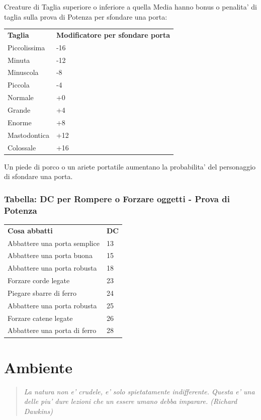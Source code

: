 \documentclass[a4paper,11pt,twoside,openany]{book}
\begin{document}
{		Creature di Taglia superiore o inferiore a quella Media hanno bonus o penalita' di taglia sulla prova di Potenza per sfondare una porta:
		
		\bigskip
		
		\begin{tabular}{ll}
			\toprule
			\textbf{Taglia} & \textbf{Modificatore per sfondare porta}\tabularnewline
			Piccolissima & -16\tabularnewline
			Minuta & -12\tabularnewline
			Minuscola & -8\tabularnewline
			Piccola & -4\tabularnewline
			Normale & +0\tabularnewline
			Grande & +4\tabularnewline
			Enorme & +8\tabularnewline
			Mastodontica & +12\tabularnewline
			Colossale & +16\tabularnewline
		\end{tabular}
		
		\bigskip
		
		Un piede di porco o un ariete portatile aumentano la probabilita' del personaggio di sfondare una porta.
		
		\subsubsection{Tabella: DC per Rompere o Forzare oggetti - Prova di Potenza}
		
		\label{tabella-dc-per-rompere-o-forzare-oggetti---prova-di-potenza}
		\bigskip
		
		\begin{tabular}{ll}
			\toprule
			\textbf{Cosa abbatti} & \textbf{DC}\tabularnewline
			Abbattere una porta semplice & 13\tabularnewline
			Abbattere una porta buona & 15\tabularnewline
			Abbattere una porta robusta & 18\tabularnewline
			Forzare corde legate & 23\tabularnewline
			Piegare sbarre di ferro & 24\tabularnewline
			Abbattere una porta robusta & 25\tabularnewline
			Forzare catene legate & 26\tabularnewline
			Abbattere una porta di ferro & 28\tabularnewline
		\end{tabular}
		\bigskip
		
		\pagebreak
		
		\section{Ambiente}
		
		\label{ambiente}
		\begin{quote}\textit{
				La natura non e' crudele, e' solo spietatamente indifferente. Questa e' una delle piu' dure lezioni che un essere umano debba imparare. (Richard Dawkins)
		}\end{quote}
		
}
\end{document}
